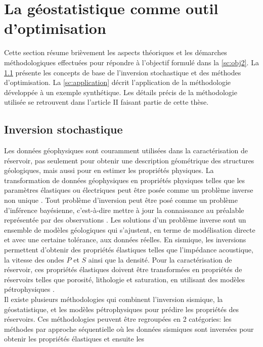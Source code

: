 \chapter{La géostatistique comme outil d’optimisation}
\label{sc:geostat}
Cette section résume brièvement les aspects théoriques et les démarches
méthodologiques effectuées pour répondre à l'objectif formulé dans la
\cref{sc:obj2}. La \cref{sc:inversion_optimisation} présente les concepts de
base de l'inversion stochastique et des méthodes d'optimisation. La
\cref{sc:application} décrit l'application de la méthodologie développée à un
exemple synthétique. Les détails précis de la méthodologie utilisée se
retrouvent dans l’article II faisant partie de cette thèse.
\section{Inversion stochastique}
\label{sc:inversion_optimisation}
Les données géophysiques sont couramment utilisées dans la caractérisation de
réservoir, pas seulement pour obtenir une description géométrique des structures
géologiques, mais aussi pour en estimer les propriétés physiques.
La transformation de données géophysiques en propriétés physiques telles que les
paramètres élastiques ou électriques peut être posée comme un problème inverse
non unique \citep{Bosch2010}. Tout problème d'inversion peut être posé comme un
problème d'inférence bayésienne, c'est-à-dire mettre à jour la connaissance au
préalable représentée par des observations
\citep{Tarantola2004,Duijndam1988b,Duijndam1988,Ulrych2001}. Les solutions d'un
problème inverse sont un ensemble de modèles géologiques qui s'ajustent, en
terme de modélisation directe et avec une certaine tolérance, aux données
réelles. En sismique, les inversions permettent d'obtenir des propriétés
élastiques telles que l’impédance acoustique, la vitesse des ondes $P$ et $S$
ainsi que la densité. Pour la caractérisation de réservoir, ces propriétés
élastiques doivent être transformées en propriétés de réservoirs telles que
porosité, lithologie et saturation, en utilisant des modèles pétrophysiques
\citep{Bosch2010}.\\
Il existe plusieurs méthodologies qui combinent l'inversion sismique, la
géostatistique, et les modèles pétrophysiques pour prédire les propriétés des
réservoirs. Ces méthodologies peuvent être regroupées en 2 catégories: les
méthodes par approche séquentielle \citep{Dubrule2003,Doyen2007} où les données
sismiques sont inversées pour obtenir les propriétés élastiques et ensuite les
